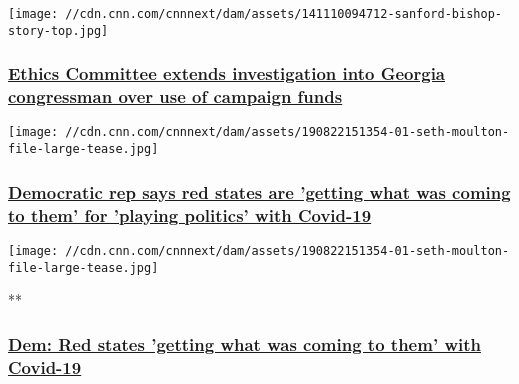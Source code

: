 \texttt{[image: //cdn.cnn.com/cnnnext/dam/assets/141110094712-sanford-bishop-story-top.jpg]}

\hypertarget{ethics-committee-extends-investigation-into-georgia-congressman-over-use-of-campaign-funds}{%
\subsubsection{\texorpdfstring{\href{/2020/07/31/politics/house-ethics-investigation-sanford-bishop/index.html}{Ethics
Committee extends investigation into Georgia congressman over use of
campaign
funds}}{Ethics Committee extends investigation into Georgia congressman over use of campaign funds}}\label{ethics-committee-extends-investigation-into-georgia-congressman-over-use-of-campaign-funds}}

\href{/2020/07/31/politics/seth-moulton-red-states-playing-politics-covid/index.html}{}

\texttt{[image: //cdn.cnn.com/cnnnext/dam/assets/190822151354-01-seth-moulton-file-large-tease.jpg]}

\hypertarget{democratic-rep-says-red-states-are-getting-what-was-coming-to-them-for-playing-politics-with-covid-19}{%
\subsubsection{\texorpdfstring{\href{/2020/07/31/politics/seth-moulton-red-states-playing-politics-covid/index.html}{Democratic
rep says red states are 'getting what was coming to them' for 'playing
politics' with
Covid-19}}{Democratic rep says red states are 'getting what was coming to them' for 'playing politics' with Covid-19}}\label{democratic-rep-says-red-states-are-getting-what-was-coming-to-them-for-playing-politics-with-covid-19}}

\href{/videos/politics/2020/08/01/seth-moulton-red-states-covid-jm-orig.cnn}{}

\texttt{[image: //cdn.cnn.com/cnnnext/dam/assets/190822151354-01-seth-moulton-file-large-tease.jpg]}

**

\hypertarget{dem-red-states-getting-what-was-coming-to-them-with-covid-19}{%
\subsubsection{\texorpdfstring{\href{/videos/politics/2020/08/01/seth-moulton-red-states-covid-jm-orig.cnn}{Dem:
Red states 'getting what was coming to them' with
Covid-19}}{Dem: Red states 'getting what was coming to them' with Covid-19}}\label{dem-red-states-getting-what-was-coming-to-them-with-covid-19}}

